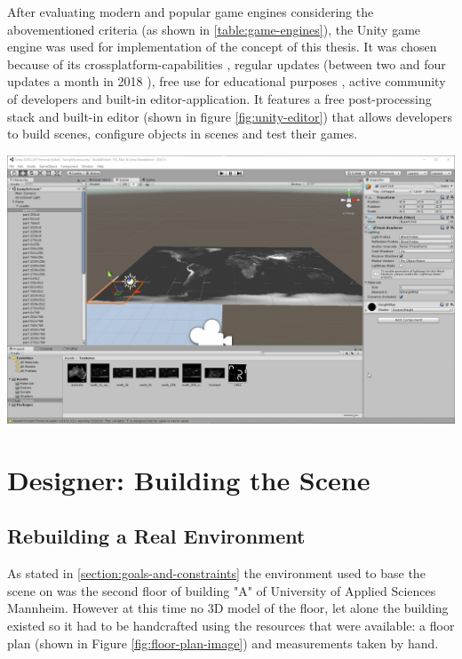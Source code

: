 After evaluating modern and popular game engines considering the abovementioned criteria (as shown in \ref{table:game-engines}), the Unity game engine was used for implementation of the concept of this thesis. It was chosen because of its crossplatform-capabilities \cite{UnityPlatformSupport}, regular updates (between two and four updates a month in 2018 \cite{UnityDownloadArchive}), free use for educational purposes \cite{UnityForEducation}, active community of developers \cite{UnityForum} and built-in editor-application. It features a free post-processing stack \cite{UnityPostProcessingStack} and built-in editor (shown in figure \ref{fig:unity-editor}) that allows developers to build scenes, configure objects in scenes and test their games.
\begin{center}
\noindent\includegraphics[width=14cm]{img/ch05/UnityScreenshot.png}
\label{fig:unity-editor}
\end{center}

\section{Designer: Building the Scene}
\subsection{Rebuilding a Real Environment}
As stated in \ref{section:goals-and-constraints} the environment used to base the scene on was the second floor of building "A" of University of Applied Sciences Mannheim. However at this time no 3D model of the floor, let alone the building existed so it had to be handcrafted using the resources that were available: a floor plan (shown in Figure \ref{fig:floor-plan-image}) and measurements taken by hand.

